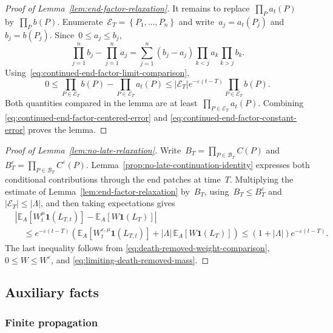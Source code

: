 \documentclass[EJP,preprint,NODS,nobera]{ejpecp}
\newcommand{\E}{\mathbb{E}}
\newcommand{\bb}[1]{\left(#1\right)}
\newcommand{\Cb}[1]{\left[#1\right]}
\newcommand{\cb}[1]{\left\{#1\right\}}
\newcommand{\abs}[1]{\left|#1\right|}
\newcommand{\ind}{\mathbf{1}}
\newcommand{\rev}[1]{{\color{red}#1}}
\begin{document}
\begin{proof}[Proof of Lemma~\ref{lem:end-factor-relaxation}]
It remains to replace~$\prod_Pa_t(P)$ by~$\prod_Pb(P)$. Enumerate~$\mathcal E_T=\cb{P_1,\ldots,P_n}$ and write~$a_j=a_t(P_j)$ and~$b_j=b(P_j)$. Since~$0\leq a_j\leq b_j$,
\begin{equation*}
\prod_{j=1}^n b_j-\prod_{j=1}^n a_j
=
\sum_{j=1}^n
\bb{b_j-a_j}
\prod_{k<j}a_k
\prod_{k>j}b_k.
\end{equation*}
Using~\eqref{eq:continued-end-factor-limit-comparison},
\begin{equation}
\label{eq:continued-end-factor-constant-error}
0
\leq
\prod_{P\in\mathcal E_T}b(P)
-
\prod_{P\in\mathcal E_T}a_t(P)
\leq
\abs{\mathcal E_T}e^{-\varepsilon(t-T)}
\prod_{P\in\mathcal E_T}b(P).
\end{equation}
Both quantities compared in the lemma are at least~$\prod_{P\in\mathcal E_T}a_t(P)$. Combining
\eqref{eq:continued-end-factor-centered-error} and
\eqref{eq:continued-end-factor-constant-error} proves the lemma.
\end{proof}

{\color{red}
\begin{proof}[Proof of Lemma~\ref{lem:no-late-relaxation}]
Write~$B_T=\prod_{P\in\mathcal B_T}C(P)$ and
$B_T^\varepsilon=\prod_{P\in\mathcal B_T}C^\varepsilon(P)$.
Lemma~\ref{prop:no-late-continuation-identity} expresses both conditional
contributions through the end patches at time~$T$.
Multiplying the estimate of Lemma~\ref{lem:end-factor-relaxation} by~$B_T$,
using~$B_T\leq B_T^\varepsilon$ and~$\abs{\mathcal E_T}\leq\abs\Lambda$,
and then taking expectations gives
\begin{align*}
&\abs{
 \E_A\Cb{W_t^\mu\ind\bb{L_{T,t}}}
 -\E_A\Cb{W\ind\bb{L_T}}
}\\
&\quad\leq
e^{-\varepsilon(t-T)}
\bb{
 \E_A\Cb{W_t^{\varepsilon,\mu}\ind\bb{L_{T,t}}}
 +\abs\Lambda\,\E_A\Cb{W\ind\bb{L_T}}
}
\leq(1+\abs\Lambda)e^{-\varepsilon(t-T)}.
\end{align*}
The last inequality follows from
\eqref{eq:death-removed-weight-comparison},
$0\leq W\leq W^\varepsilon$, and
\eqref{eq:limiting-death-removed-mass}.
\end{proof}
}

\subsection{\texorpdfstring{\rev{Auxiliary facts}}{Auxiliary facts}}
\label{subsec:auxiliary}

\subsubsection{\texorpdfstring{\rev{Finite propagation}}{Finite propagation}}
\label{subsec:finite-propagation-proof}
\end{document}
